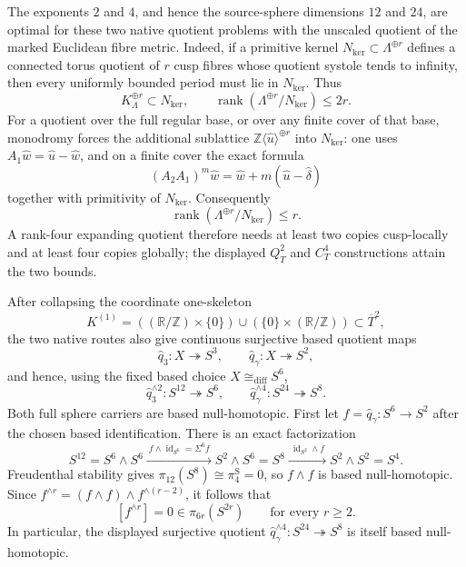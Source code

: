 \begin{enumerate}[leftmargin=1.8em]
The exponents \(2\) and \(4\), and hence the source-sphere dimensions
\(12\) and \(24\), are optimal for these two native quotient problems with
the unscaled quotient of the marked Euclidean fibre metric.  Indeed, if a
primitive kernel \(N_{\mathrm{ker}}\subset\Lambda^{\oplus r}\) defines a
connected torus
quotient of \(r\) cusp fibres whose quotient systole tends to infinity, then
every uniformly bounded period must lie in \(N_{\mathrm{ker}}\).  Thus
\[
 K_\Lambda^{\oplus r}\subset N_{\mathrm{ker}},\qquad
 \operatorname{rank}(\Lambda^{\oplus r}/N_{\mathrm{ker}})\le 2r.
\]
For a quotient over the full regular base, or over any finite cover of that
base, monodromy forces the additional sublattice
\(\mathbb Z\langle\widehat u\rangle^{\oplus r}\) into
\(N_{\mathrm{ker}}\): one uses
\(A_1\widehat w=\widehat u-\widehat w\), and on a finite cover the exact
formula
\[
 (A_2A_1)^m\widehat w
 =\widehat w+m(\widehat u-\widehat\delta)
\]
together with primitivity of \(N_{\mathrm{ker}}\).  Consequently
\[
 \operatorname{rank}(\Lambda^{\oplus r}/N_{\mathrm{ker}})\le r.
\]
A rank-four expanding quotient therefore needs at least two copies
cusp-locally and at least four copies globally; the displayed
\(Q_T^2\) and \(C_T^4\) constructions attain the two bounds.

After collapsing the coordinate one-skeleton
\[
 K^{(1)}=
 ((\mathbb R/\mathbb Z)\times\{0\})
 \cup(\{0\}\times(\mathbb R/\mathbb Z))
 \subset\overline T^2,
\]
the two native routes also give continuous surjective based quotient maps
\[
 \widehat q_3:X\twoheadrightarrow S^3,\qquad
 \widehat q_\gamma:X\twoheadrightarrow S^2,
\]
and hence, using the fixed based choice
\(X\cong_{\mathrm{diff}}S^6\),
\[
 \widehat q_3^{\wedge2}:S^{12}\twoheadrightarrow S^6,\qquad
 \widehat q_\gamma^{\wedge4}:S^{24}\twoheadrightarrow S^8.
\]
Both full sphere carriers are based null-homotopic.  First let
\(f=\widehat q_\gamma:S^6\to S^2\) after the chosen based identification.
There is an exact factorization
\[
 S^{12}=S^6\wedge S^6
 \xrightarrow{\ f\wedge\operatorname{id}_{S^6}=\Sigma^6f\ }
 S^2\wedge S^6=S^8
 \xrightarrow{\ \operatorname{id}_{S^2}\wedge f\ }
 S^2\wedge S^2=S^4.
\]
Freudenthal stability gives
\(\pi_{12}(S^8)\cong\pi_4^{\mathrm S}=0\), so \(f\wedge f\) is based
null-homotopic.  Since
\(f^{\wedge r}=(f\wedge f)\wedge f^{\wedge(r-2)}\), it follows that
\[
 [f^{\wedge r}]=0\in\pi_{6r}(S^{2r})
 \qquad\text{for every }r\ge2.
\]
In particular, the displayed surjective quotient
\(\widehat q_\gamma^{\wedge4}:S^{24}\twoheadrightarrow S^8\) is itself
based null-homotopic.


\end{enumerate}
